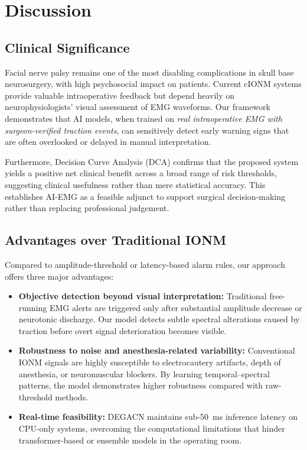 \documentclass[10pt]{article}
\begin{document}
\section{Discussion}

\subsection{Clinical Significance}

Facial nerve palsy remains one of the most disabling complications in skull base neurosurgery, with high psychosocial impact on patients. Current cIONM systems provide valuable intraoperative feedback but depend heavily on neurophysiologists' visual assessment of EMG waveforms. Our framework demonstrates that AI models, when trained on \emph{real intraoperative EMG with surgeon-verified traction events}, can sensitively detect early warning signs that are often overlooked or delayed in manual interpretation. 

Furthermore, Decision Curve Analysis (DCA) confirms that the proposed system yields a positive net clinical benefit across a broad range of risk thresholds, suggesting clinical usefulness rather than mere statistical accuracy. This establishes AI-EMG as a feasible adjunct to support surgical decision-making rather than replacing professional judgement.

\subsection{Advantages over Traditional IONM}

Compared to amplitude-threshold or latency-based alarm rules, our approach offers three major advantages:

\begin{itemize}
    \item \textbf{Objective detection beyond visual interpretation:} Traditional free-running EMG alerts are triggered only after substantial amplitude decrease or neurotonic discharge. Our model detects subtle spectral alterations caused by traction before overt signal deterioration becomes visible.
    \item \textbf{Robustness to noise and anesthesia-related variability:} Conventional IONM signals are highly susceptible to electrocautery artifacts, depth of anesthesia, or neuromuscular blockers. By learning temporal–spectral patterns, the model demonstrates higher robustness compared with raw-threshold methods.
    \item \textbf{Real-time feasibility:} DEGACN maintains sub-\SI{50}{ms} inference latency on CPU-only systems, overcoming the computational limitations that hinder transformer-based or ensemble models in the operating room.
\end{itemize}
\end{document}
